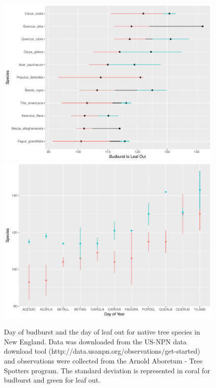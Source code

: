 \documentclass{article}\usepackage[]{graphicx}\usepackage[]{color}
\begin{document}
\begin{figure} [H]
\begin{center}
\caption{Day of budburst and the day of leaf out for native tree species in New England. Data was downloaded from the US-NPN data download tool (http://data.usanpn.org/observations/get-started) and observations were collected from the Arnold Aboretum - Tree Spotters program. The standard deviation is represented in coral for budburst and green for leaf out. }
\includegraphics{..//figure/TS_2016.pdf} 
\includegraphics{..//figure/TS_2016_sd.pdf} 
\end{center}
\end{figure}
\end{document}
